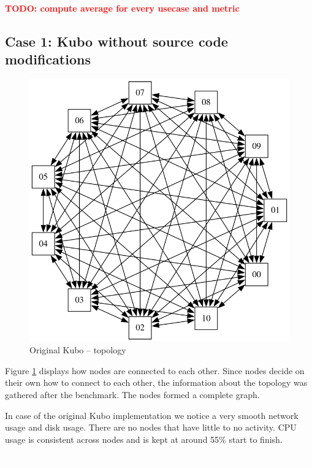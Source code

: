 \textcolor{red}{\textbf{TODO: compute average for every usecase and metric}}\\

\subsection{Case 1: Kubo without source code modifications}

\begin{figure}
\centering
\captionsetup{justification=centering,width=0.6\linewidth}
\includegraphics[width=0.8\linewidth]{figures/topologies/original.png}
\caption{Original Kubo -- topology}
\label{fig:original-topology}
\end{figure}

Figure \ref{fig:original-topology} displays how nodes are connected to each
other. Since nodes decide on their own how to connect to each other, the
information about the topology was gathered after the benchmark. The nodes
formed a complete graph.

In case of the original Kubo implementation we notice a very smooth network
usage and disk usage. There are no nodes that have little to no activity. CPU
usage is consistent across nodes and is kept at around 55\% start to finish.

\textcolor{white}{.}\\\\\\\\\\\\\\\\\\\\

